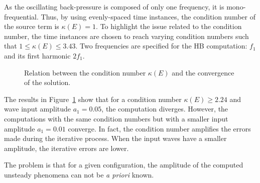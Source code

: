 As the oscillating back-pressure is composed of only one frequency,
it is mono-frequential.
Thus, by using evenly-spaced time instances, the condition
number of the source term is $\kappa (E) = 1$. 
To highlight the issue related to the condition number,
the time instances are chosen to reach varying condition numbers
such that $1 \leq \kappa (E) \leq 3.43$.  
Two frequencies are
specified for the HB computation: $f_1$ and its first harmonic
$2f_1$. 


\begin{figure}[htp]
  \centering
  \caption{Relation between the condition number $\kappa (E)$ and the convergence of the solution.}
  \label{fig:canal_residual_vs_conditionning}
\end{figure}
The results in Figure~\ref{fig:canal_residual_vs_conditionning} show that
for a condition number $\kappa (E) \geq 2.24$ and wave input amplitude
$a_1 = 0.05$, the computation diverges. However, the computations with
the same condition numbers but with a smaller input amplitude $a_1 = 0.01$
converge. In fact, the condition number amplifies the errors made
during the iterative process. When the input waves have a smaller
amplitude, the iterative errors are lower.

The problem is that for a given configuration, the 
amplitude of the computed unsteady phenomena can not
be \emph{a priori} known. 

